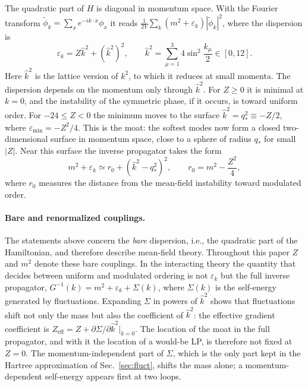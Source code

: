 \documentclass[aps,prd,twocolumn,superscriptaddress,nofootinbib,10pt]{revtex4-2}
\newcommand{\khat}{\widehat{k}^{2}}
\newcommand{\qs}{q_*}
\newcommand{\eff}{\mathrm{eff}}
\begin{document}
The quadratic part of $H$ is diagonal in momentum space.  With the Fourier
transform $\tilde\phi_k=\sum_x e^{-ik\cdot x}\phi_x$ it reads
$\frac{1}{2V}\sum_k(m^2+\varepsilon_k)|\tilde\phi_k|^2$, where the
dispersion is
\begin{equation}
 \varepsilon_k=Z\khat+(\khat)^2,\qquad
 \khat=\sum_{\mu=1}^3 4\sin^2\frac{k_\mu}{2}\in[0,12].
 \label{eq:disp}
\end{equation}
Here $\khat$ is the lattice version of $k^2$, to which it reduces at small
momenta.  The dispersion depends on the momentum only through $\khat$.  For
$Z\ge0$ it is minimal at $k=0$, and the instability of the symmetric phase,
if it occurs, is toward uniform order.  For $-24\le Z<0$ the minimum moves to
the surface $\khat=\qs^2\equiv-Z/2$, where $\varepsilon_{\min}=-Z^2/4$.  This
is the moat: the softest modes now form a closed two-dimensional surface in
momentum space, close to a sphere of radius $\qs$ for small $|Z|$.  Near this
surface the inverse propagator takes the form
\begin{equation}
 m^2+\varepsilon_k\simeq r_0+(\khat-\qs^2)^2,\qquad r_0=m^2-\frac{Z^2}{4},
 \label{eq:moat}
\end{equation}
where $r_0$ measures the distance from the mean-field instability toward
modulated order.

\paragraph*{Bare and renormalized couplings.}
The statements above concern the \emph{bare} dispersion, i.e., the quadratic
part of the Hamiltonian, and therefore describe mean-field theory.  Throughout
this paper $Z$ and $m^2$ denote these bare couplings.  In the interacting
theory the quantity that decides between uniform and modulated ordering is
not $\varepsilon_k$ but the full inverse propagator,
$G^{-1}(k)=m^2+\varepsilon_k+\Sigma(k)$, where $\Sigma(k)$ is the self-energy
generated by fluctuations.  Expanding $\Sigma$ in powers of $\khat$ shows that
fluctuations shift not only the mass but also the coefficient of $\khat$:
the effective gradient coefficient is
$Z_\eff=Z+\partial\Sigma/\partial\khat|_{k=0}$.  The location of the moat in
the full propagator, and with it the location of a would-be LP, is therefore
not fixed at $Z=0$.  The momentum-independent part of $\Sigma$, which is the
only part kept in the Hartree approximation of Sec.~\ref{sec:fluct}, shifts
the mass alone; a momentum-dependent self-energy appears first at two loops.
\end{document}
